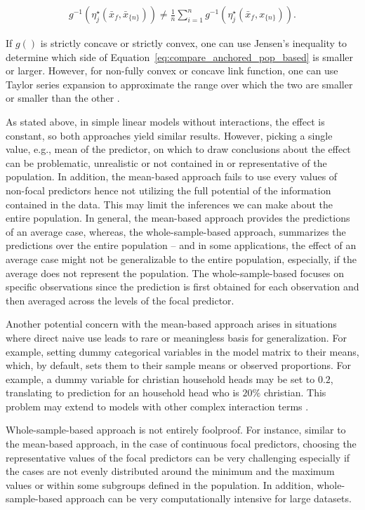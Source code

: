 \documentclass[10pt,letterpaper]{article}
\newcommand{\nset}[1]{#1_{\{n\}}}
\begin{document}
\begin{align}\label{eq:compare_anchored_pop_based}
g^{-1} \left(\eta_j^\star(\bar{x}_f, \nset{\bar{x}})\right) \neq \frac{1}{n} \sum_{i=1}^n{ g^{-1} \left(\eta_j^\star(\bar{x}_f, \nset{x})\right)}.
\end{align}

If $g()$ is strictly concave or strictly convex, one can use Jensen's inequality to determine which side of Equation~\ref{eq:compare_anchored_pop_based} is smaller or larger. However, for non-fully convex or concave link function, one can use Taylor series expansion to approximate the range over which the two are smaller or smaller than the other \cite{hanmer2013behind}. 


As stated above, in simple linear models without interactions, the effect is constant, so both approaches yield similar results. However, picking a single value, e.g., mean of the predictor, on which to draw conclusions about the effect can be problematic, unrealistic or not contained in or representative of the population. In addition, the mean-based approach fails to use every values of non-focal predictors hence not utilizing the full potential of the information contained in the data. This may limit the inferences we can make about the entire population. In general, the mean-based approach provides the predictions of an average case, whereas, the whole-sample-based approach, summarizes the predictions over the entire population -- and in some applications, the effect of an average case might not be generalizable to the entire population, especially, if the average does not represent the population. The whole-sample-based focuses on specific observations since the prediction is first obtained for each observation and then averaged across the levels of the focal predictor.

Another potential concern with the mean-based approach arises in situations where direct naive use leads to rare or meaningless basis for generalization. For example, setting dummy categorical variables in the model matrix to their means, which, by default, sets them to their sample means or observed proportions. For example, a dummy variable for christian household heads may be set to $0.2$, translating to prediction for an household head who is $20\%$ christian. This problem may extend to models with other complex interaction terms \cite{hanmer2013behind}.

Whole-sample-based approach is not entirely foolproof. For instance, similar to the mean-based approach, in the case of continuous focal predictors, choosing the representative values of the focal predictors can be very challenging especially if the cases are not evenly distributed around the minimum and the maximum values or within some subgroups defined in the population. In addition, whole-sample-based approach can be very computationally intensive for large datasets.
\end{document}
